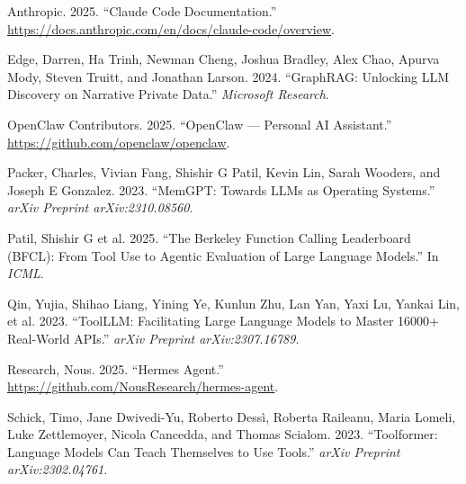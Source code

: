 \documentclass[
  10pt,
]{article}
\newlength{\cslhangindent}
\newenvironment{CSLReferences}[2] %
 {\begin{list}{}{%
  \setlength{\itemindent}{0pt}
  \setlength{\leftmargin}{0pt}
  \setlength{\parsep}{0pt}
  \ifodd #1
   \setlength{\leftmargin}{\cslhangindent}
   \setlength{\itemindent}{-1\cslhangindent}
  \fi
  \setlength{\itemsep}{#2\baselineskip}}}
 {\end{list}}
\begin{document}
\label{refs}
\begin{CSLReferences}{1}{0}
Anthropic. 2025. {``Claude Code Documentation.''}
\url{https://docs.anthropic.com/en/docs/claude-code/overview}.

Edge, Darren, Ha Trinh, Newman Cheng, Joshua Bradley, Alex Chao, Apurva
Mody, Steven Truitt, and Jonathan Larson. 2024. {``GraphRAG: Unlocking
LLM Discovery on Narrative Private Data.''} \emph{Microsoft Research}.

OpenClaw Contributors. 2025. {``OpenClaw --- Personal AI Assistant.''}
\url{https://github.com/openclaw/openclaw}.

Packer, Charles, Vivian Fang, Shishir G Patil, Kevin Lin, Sarah Wooders,
and Joseph E Gonzalez. 2023. {``MemGPT: Towards LLMs as Operating
Systems.''} \emph{arXiv Preprint arXiv:2310.08560}.

Patil, Shishir G et al. 2025. {``The Berkeley Function Calling
Leaderboard (BFCL): From Tool Use to Agentic Evaluation of Large
Language Models.''} In \emph{ICML}.

Qin, Yujia, Shihao Liang, Yining Ye, Kunlun Zhu, Lan Yan, Yaxi Lu,
Yankai Lin, et al. 2023. {``ToolLLM: Facilitating Large Language Models
to Master 16000+ Real-World APIs.''} \emph{arXiv Preprint
arXiv:2307.16789}.

Research, Nous. 2025. {``Hermes Agent.''}
\url{https://github.com/NousResearch/hermes-agent}.

Schick, Timo, Jane Dwivedi-Yu, Roberto Dessì, Roberta Raileanu, Maria
Lomeli, Luke Zettlemoyer, Nicola Cancedda, and Thomas Scialom. 2023.
{``Toolformer: Language Models Can Teach Themselves to Use Tools.''}
\emph{arXiv Preprint arXiv:2302.04761}.

\end{CSLReferences}
\end{document}
